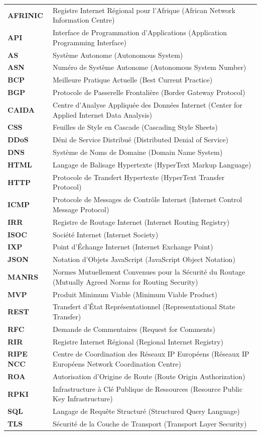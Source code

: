 \documentclass{eneam}
\begin{document}
\begin{tabularx}{\textwidth}{>{\bfseries}l X}
AFRINIC  & Registre Internet Régional pour l'Afrique (African Network Information Centre) \\
API      & Interface de Programmation d'Applications (Application Programming Interface) \\
AS       & Système Autonome (Autonomous System) \\
ASN      & Numéro de Système Autonome (Autonomous System Number) \\
BCP      & Meilleure Pratique Actuelle (Best Current Practice) \\
BGP      & Protocole de Passerelle Frontalière (Border Gateway Protocol) \\
CAIDA    & Centre d'Analyse Appliquée des Données Internet (Center for Applied Internet Data Analysis) \\
CSS      & Feuilles de Style en Cascade (Cascading Style Sheets) \\
DDoS     & Déni de Service Distribué (Distributed Denial of Service) \\
DNS      & Système de Noms de Domaine (Domain Name System) \\
HTML     & Langage de Balisage Hypertexte (HyperText Markup Language) \\
HTTP     & Protocole de Transfert Hypertexte (HyperText Transfer Protocol) \\
ICMP     & Protocole de Messages de Contrôle Internet (Internet Control Message Protocol) \\
IRR      & Registre de Routage Internet (Internet Routing Registry) \\
ISOC     & Société Internet (Internet Society) \\
IXP      & Point d'Échange Internet (Internet Exchange Point) \\
JSON     & Notation d'Objets JavaScript (JavaScript Object Notation) \\
MANRS    & Normes Mutuellement Convenues pour la Sécurité du Routage (Mutually Agreed Norms for Routing Security) \\
MVP      & Produit Minimum Viable (Minimum Viable Product) \\
REST     & Transfert d'État Représentationnel (Representational State Transfer) \\
RFC      & Demande de Commentaires (Request for Comments) \\
RIR      & Registre Internet Régional (Regional Internet Registry) \\
RIPE NCC & Centre de Coordination des Réseaux IP Européens (Réseaux IP Européens Network Coordination Centre) \\
ROA      & Autorisation d'Origine de Route (Route Origin Authorization) \\
RPKI     & Infrastructure à Clé Publique de Ressources (Resource Public Key Infrastructure) \\
SQL      & Langage de Requête Structuré (Structured Query Language) \\
TLS      & Sécurité de la Couche de Transport (Transport Layer Security) \\
\end{tabularx}
\end{document}
